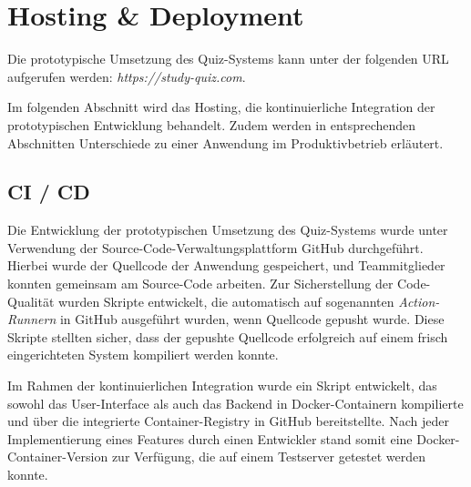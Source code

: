\section{Hosting \& Deployment}

Die prototypische Umsetzung des Quiz-Systems kann unter der folgenden URL aufgerufen werden: \textit{https://study-quiz.com}. \newline

\noindent Im folgenden Abschnitt wird das Hosting, die kontinuierliche Integration der prototypischen Entwicklung behandelt. 
Zudem werden in entsprechenden Abschnitten Unterschiede zu einer Anwendung im Produktivbetrieb erläutert.

\subsection{CI / CD}

Die Entwicklung der prototypischen Umsetzung des Quiz-Systems wurde unter Verwendung der
Source-Code-Verwaltungsplattform GitHub durchgeführt. Hierbei wurde der Quellcode der Anwendung
gespeichert, und Teammitglieder konnten gemeinsam am Source-Code arbeiten. Zur Sicherstellung
der Code-Qualität wurden Skripte entwickelt, die automatisch auf sogenannten \textit{Action-Runnern}
in GitHub ausgeführt wurden, wenn Quellcode gepusht wurde. Diese Skripte stellten sicher, dass der
gepushte Quellcode erfolgreich auf einem frisch eingerichteten System kompiliert werden konnte. \newline

\noindent Im Rahmen der kontinuierlichen Integration wurde ein Skript entwickelt, das sowohl das User-Interface 
als auch das Backend in Docker-Containern kompilierte und über die integrierte Container-Registry 
in GitHub bereitstellte. Nach jeder Implementierung eines Features durch einen Entwickler stand 
somit eine Docker-Container-Version zur Verfügung, die auf einem Testserver getestet werden konnte.


